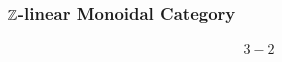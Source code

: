 %         
%         
%         
%         
%         
%         
%         
%         


\begin{frame}
    \frametitle{$\mathbb{Z}$-linear Monoidal Category}

    \begin{gather*}
        3  - 2 
    \end{gather*}
\end{frame}
